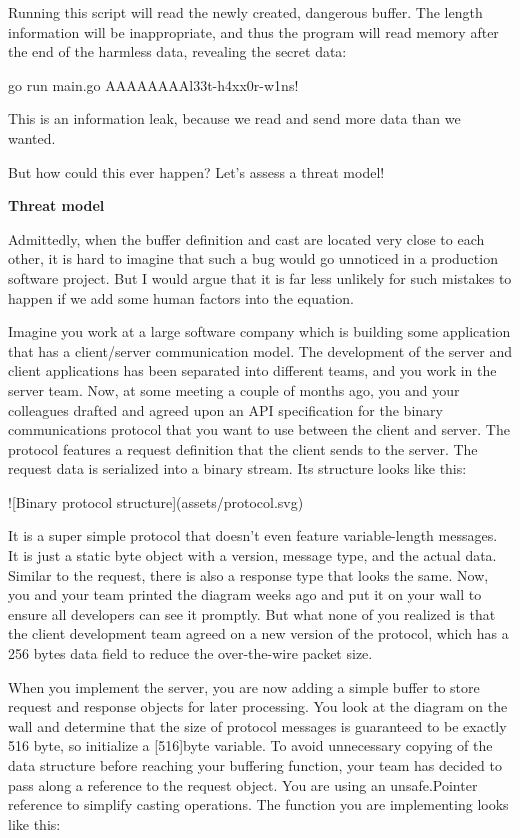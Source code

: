 Running this script will read the newly created, dangerous buffer. The length information will be inappropriate, and 
thus the program will read memory after the end of the harmless data, revealing the secret data:

go run main.go
AAAAAAAAl33t-h4xx0r-w1ns!

This is an information leak, because we read and send more data than we wanted.

But how could this ever happen? Let's assess a threat model!


\textbf{Threat model}

Admittedly, when the buffer definition and cast are located very close to each other, it is hard to imagine that such
a bug would go unnoticed in a production software project. But I would argue that it is far less unlikely for such 
mistakes to happen if we add some human factors into the equation.

Imagine you work at a large software company which is building some application that has a client/server communication
model. The development of the server and client applications has been separated into different teams, and you work in
the server team. Now, at some meeting a couple of months ago, you and your colleagues drafted and agreed upon an API
specification for the binary communications protocol that you want to use between the client and server. The protocol
features a request definition that the client sends to the server. The request data is serialized into a binary stream.
Its structure looks like this:

![Binary protocol structure](assets/protocol.svg)

It is a super simple protocol that doesn't even feature variable-length messages. It is just a static byte object with
a version, message type, and the actual data. Similar to the request, there is also a response type that looks the same.
Now, you and your team printed the diagram weeks ago and put it on your wall to ensure all developers can see it promptly.
But what none of you realized is that the client development team agreed on a new version of the protocol, which has a
256 bytes data field to reduce the over-the-wire packet size.

When you implement the server, you are now adding a simple buffer to store request and response objects for later
processing. You look at the diagram on the wall and determine that the size of protocol messages is guaranteed to be
exactly 516 byte, so initialize a [516]byte variable. To avoid unnecessary copying of the data structure before
reaching your buffering function, your team has decided to pass along a reference to the request object. You are using
an unsafe.Pointer reference to simplify casting operations. The function you are implementing looks like this:

